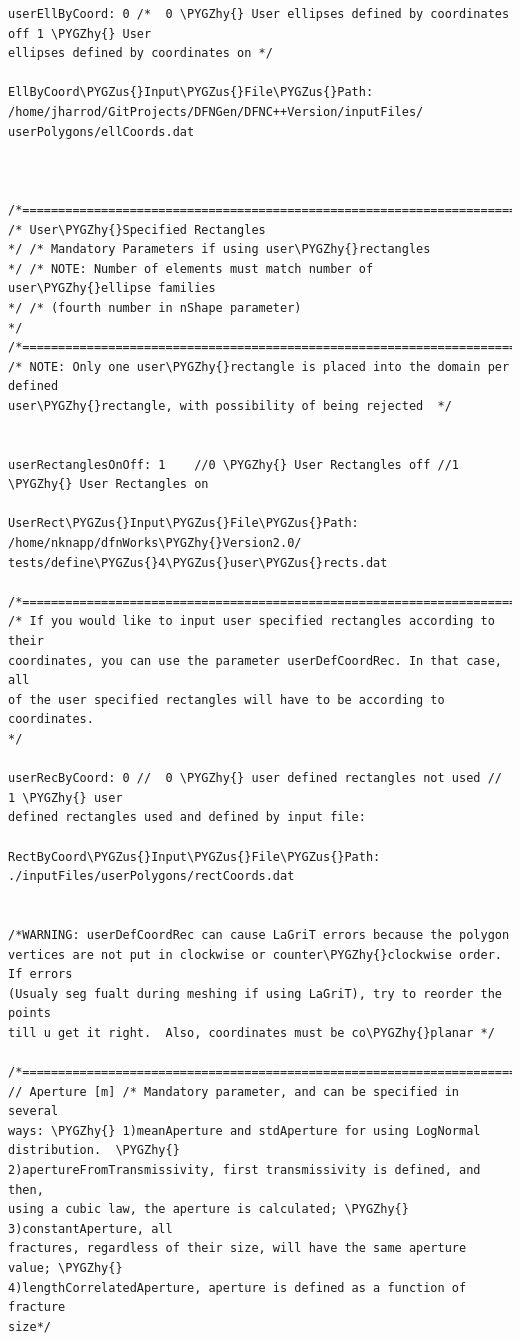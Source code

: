 \documentclass[letterpaper,10pt,english]{sphinxmanual}
\def\PYGZus{\char`\_}
\def\PYGZhy{\char`\-}
\begin{document}
\begin{Verbatim}[commandchars=\\\{\}]
userEllByCoord: 0 /*  0 \PYGZhy{} User ellipses defined by coordinates off 1 \PYGZhy{} User
ellipses defined by coordinates on */

EllByCoord\PYGZus{}Input\PYGZus{}File\PYGZus{}Path:
/home/jharrod/GitProjects/DFNGen/DFNC++Version/inputFiles/
userPolygons/ellCoords.dat



/*===========================================================================*/
/* User\PYGZhy{}Specified Rectangles
*/ /* Mandatory Parameters if using user\PYGZhy{}rectangles
*/ /* NOTE: Number of elements must match number of user\PYGZhy{}ellipse families
*/ /* (fourth number in nShape parameter)
*/
/*===========================================================================*/
/* NOTE: Only one user\PYGZhy{}rectangle is placed into the domain per defined
user\PYGZhy{}rectangle, with possibility of being rejected  */


userRectanglesOnOff: 1    //0 \PYGZhy{} User Rectangles off //1 \PYGZhy{} User Rectangles on

UserRect\PYGZus{}Input\PYGZus{}File\PYGZus{}Path: /home/nknapp/dfnWorks\PYGZhy{}Version2.0/
tests/define\PYGZus{}4\PYGZus{}user\PYGZus{}rects.dat

/*===========================================================================*/
/* If you would like to input user specified rectangles according to their
coordinates, you can use the parameter userDefCoordRec. In that case, all
of the user specified rectangles will have to be according to coordinates.
*/

userRecByCoord: 0 //  0 \PYGZhy{} user defined rectangles not used //  1 \PYGZhy{} user
defined rectangles used and defined by input file:

RectByCoord\PYGZus{}Input\PYGZus{}File\PYGZus{}Path: ./inputFiles/userPolygons/rectCoords.dat


/*WARNING: userDefCoordRec can cause LaGriT errors because the polygon
vertices are not put in clockwise or counter\PYGZhy{}clockwise order.  If errors
(Usualy seg fualt during meshing if using LaGriT), try to reorder the points
till u get it right.  Also, coordinates must be co\PYGZhy{}planar */

/*===========================================================================*/
// Aperture [m] /* Mandatory parameter, and can be specified in several
ways: \PYGZhy{} 1)meanAperture and stdAperture for using LogNormal distribution.  \PYGZhy{}
2)apertureFromTransmissivity, first transmissivity is defined, and then,
using a cubic law, the aperture is calculated; \PYGZhy{} 3)constantAperture, all
fractures, regardless of their size, will have the same aperture value; \PYGZhy{}
4)lengthCorrelatedAperture, aperture is defined as a function of fracture
size*/


\end{Verbatim}
\end{document}
